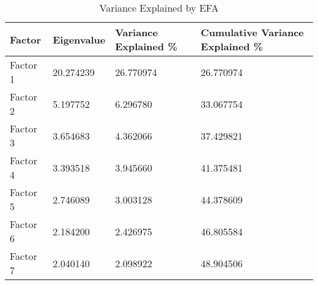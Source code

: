 \begin{table}[htbp]
\centering
\caption{Variance Explained by EFA}
\label{tab:your_label}
\begin{tabular}{llll}
\toprule
Factor & Eigenvalue & Variance Explained \% & Cumulative Variance Explained \% \\
\midrule
Factor 1 & 20.274239 & 26.770974 & 26.770974 \\
Factor 2 & 5.197752 & 6.296780 & 33.067754 \\
Factor 3 & 3.654683 & 4.362066 & 37.429821 \\
Factor 4 & 3.393518 & 3.945660 & 41.375481 \\
Factor 5 & 2.746089 & 3.003128 & 44.378609 \\
Factor 6 & 2.184200 & 2.426975 & 46.805584 \\
Factor 7 & 2.040140 & 2.098922 & 48.904506 \\
\bottomrule
\end{tabular}
\end{table}
